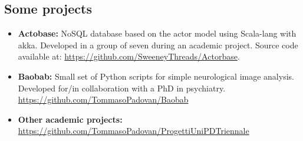 \documentclass[letterpaper]{twentysecondcv} %
\begin{document}
\subsection{Some projects}
\begin{itemize}[noitemsep,nolistsep]
	\item \textbf{Actobase:} NoSQL database based on the actor model using Scala-lang with akka. Developed in a group of seven during an academic project. Source code available at: \url{https://github.com/SweeneyThreads/Actorbase}.
	\item \textbf{Baobab:} Small set of Python scripts for simple neurological image analysis. Developed for/in collaboration with a PhD in psychiatry. \url{https://github.com/TommasoPadovan/Baobab}
	\item \textbf{Other academic projects:} \\\url{https://github.com/TommasoPadovan/ProgettiUniPDTriennale}
\end{itemize}








\end{document}
